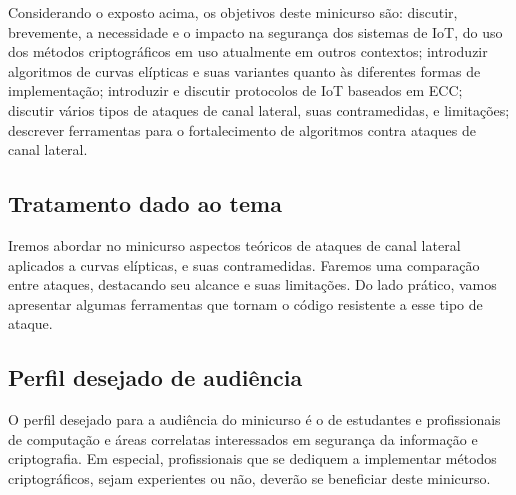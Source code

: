 \documentclass[12pt]{article}
\begin{document}
Considerando o  exposto acima, os objetivos deste minicurso s\~ao: discutir, brevemente, a necessidade e o impacto na segurança dos sistemas de IoT, do uso dos métodos criptográficos em uso atualmente em outros contextos; introduzir algoritmos de curvas el\'ipticas e suas variantes quanto às diferentes formas de implementação; introduzir e discutir protocolos de IoT baseados em ECC; discutir vários tipos de ataques de canal lateral, suas contramedidas, e limita\c{c}\~oes; descrever ferramentas para o fortalecimento de  algoritmos contra ataques de canal lateral.

\subsection{Tratamento dado ao tema}
Iremos abordar no minicurso aspectos te\'oricos de ataques de canal lateral aplicados a curvas el\'ipticas, e suas contramedidas. Faremos uma compara\c{c}\~ao entre ataques, destacando seu alcance e suas limita\c{c}\~oes. Do lado prático, vamos apresentar algumas  ferramentas que tornam o c\'odigo resistente a esse tipo de ataque. 

\subsection{Perfil desejado de audi\^encia}
O perfil desejado para a audiência do minicurso é o de estudantes e profissionais de computação e áreas correlatas interessados em segurança da informação e criptografia. Em especial, profissionais que se dediquem a implementar métodos criptográficos, sejam experientes ou não, deverão se beneficiar deste minicurso.  
\end{document}
